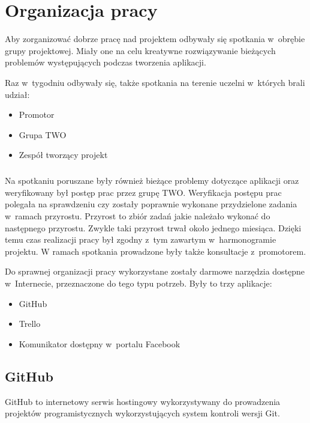 \chapter{Organizacja pracy}



Aby zorganizować dobrze pracę nad projektem odbywały się spotkania w~obrębie grupy projektowej. Miały one na celu kreatywne rozwiązywanie bieżących problemów występujących podczas tworzenia aplikacji. 

Raz w~tygodniu odbywały się, także spotkania na terenie uczelni w~których brali udział:
\begin{itemize}
\item Promotor
\item Grupa TWO
\item Zespół tworzący projekt
\end{itemize}

\paragraph{}
Na spotkaniu poruszane były również bieżące problemy dotyczące aplikacji oraz weryfikowany był postęp prac przez grupę TWO. Weryfikacja postępu prac polegała na sprawdzeniu czy zostały poprawnie wykonane przydzielone zadania w~ramach przyrostu. Przyrost to zbiór zadań jakie należało wykonać do następnego przyrostu. Zwykle taki przyrost trwał około jednego miesiąca. Dzięki temu czas realizacji pracy był zgodny z~tym zawartym w~harmonogramie projektu. W ramach spotkania prowadzone były także konsultacje z~promotorem.

Do sprawnej organizacji pracy wykorzystane zostały darmowe narzędzia dostępne w~Internecie, przeznaczone do tego typu potrzeb. Były to trzy aplikacje:
\begin{itemize}
\item GitHub
\item Trello
\item Komunikator dostępny w~portalu Facebook
\end{itemize}

\section{GitHub}
GitHub to internetowy serwis hostingowy wykorzystywany do prowadzenia projektów programistycznych wykorzystujących system kontroli wersji Git. 

